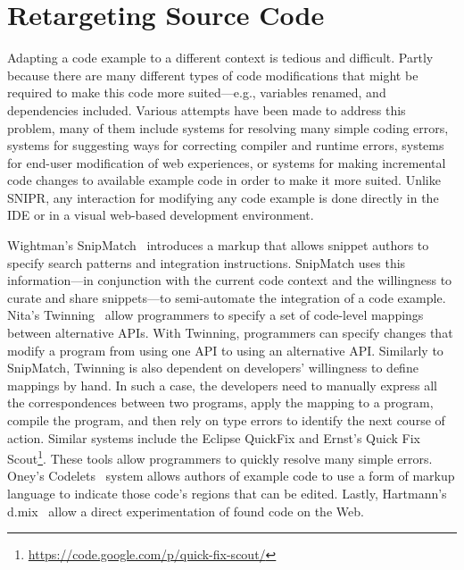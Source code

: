 \section{Retargeting Source Code}
\label{sec:retargetingcode}

Adapting a code example to a different context is tedious and difficult. Partly because there are many different types of code modifications that might be required to make this code more suited---e.g., variables renamed, and dependencies included. Various attempts have been made to address this problem, many of them include systems for resolving many simple coding errors, systems for suggesting ways for correcting compiler and runtime errors, systems for end-user modification of web experiences, or systems for making incremental code changes to available example code in order to make it more suited. Unlike \uppercase{SnipR}, any interaction for modifying any code example is done directly in the IDE or in a visual web-based development environment.  

Wightman's SnipMatch~\cite{Wightman:2012gc} introduces a markup that allows snippet authors to specify search patterns and integration instructions. SnipMatch uses this information---in conjunction with the current code context and the willingness to curate and share snippets---to semi-automate the integration of a code example. Nita's Twinning~\cite{Nita:2010en} allow programmers to specify a set of code-level mappings between alternative APIs. With Twinning, programmers can specify changes that modify a program from using one API to using an alternative API. Similarly to SnipMatch, Twinning is also dependent on developers' willingness to define mappings by hand. In such a case, the developers need to manually express all the correspondences between two programs, apply the mapping to a program, compile the program, and then rely on type errors to identify the next course of action.  Similar systems include the Eclipse QuickFix and Ernst's Quick Fix Scout\footnote{\url{https://code.google.com/p/quick-fix-scout/}}. These tools allow programmers to quickly resolve many simple errors. Oney's Codelets~\cite{Oney:2012ge} system allows authors of example code to use a form of markup language to indicate those code's regions that can be edited. Lastly, Hartmann's d.mix~\cite{Hartmann:2007wf} allow a direct experimentation of found code on the Web.

